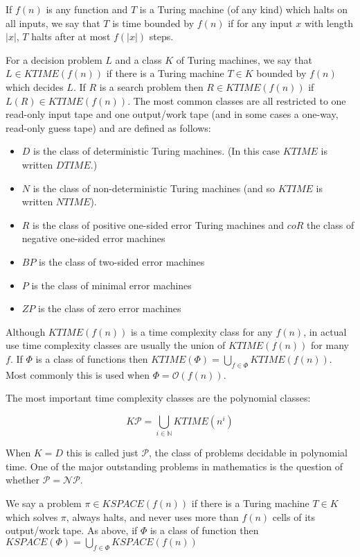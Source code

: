\documentclass[12pt]{article}
\begin{document}
If $f(n)$ is any function and $T$ is a Turing machine (of any kind) which halts on all inputs, we say that $T$ is time bounded by $f(n)$ if for any input $x$ with length $|x|$, $T$ halts after at most $f(|x|)$ steps.

For a decision problem $L$ and a class $K$ of Turing machines, we say that $L\in KTIME(f(n))$ if there is a Turing machine $T\in K$ bounded by $f(n)$ which decides $L$.  If $R$ is a search problem then $R\in KTIME(f(n))$ if $L(R)\in KTIME(f(n))$.  The most common classes are all restricted to one read-only input tape and one output/work tape (and in some cases a one-way, read-only guess tape) and are defined as follows:

\begin{itemize}
\item $D$ is the class of deterministic Turing machines. (In this case $KTIME$ is written $DTIME$.)

\item $N$ is the class of non-deterministic Turing machines (and so $KTIME$ is written $NTIME$).

\item $R$ is the class of positive one-sided error Turing machines and $coR$ the class of negative one-sided error machines

\item $BP$ is the class of two-sided error machines

\item $P$ is the class of minimal error machines

\item $ZP$ is the class of zero error machines
\end{itemize}

Although $KTIME(f(n))$ is a time complexity class for any $f(n)$, in actual use time complexity classes are usually the union of $KTIME(f(n))$ for many $f$.  If $\Phi$ is a class of functions then $KTIME(\Phi)=\bigcup_{f\in\Phi} KTIME(f(n))$.  Most commonly this is used when $\Phi=\mathcal{O}(f(n))$.

The most important time complexity classes are the polynomial classes:

$$K\mathcal{P}=\bigcup_{i\in\mathbb{N}} KTIME(n^i)$$

When $K=D$ this is called just $\mathcal{P}$, the class of problems decidable in polynomial time.  One of the major outstanding problems in mathematics is the question of whether $\mathcal{P}=\mathcal{NP}$.

We say a problem $\pi\in KSPACE(f(n))$ if there is a Turing machine $T\in K$ which solves $\pi$, always halts, and never uses more than $f(n)$ cells of its output/work tape.  As above, if $\Phi$ is a class of function then $KSPACE(\Phi)=\bigcup_{f\in\Phi} KSPACE(f(n))$
\end{document}
